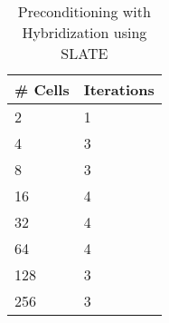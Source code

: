 \documentclass[11pt]{article}
\begin{document}
\begin{table}[h!]
	\begin{center}
		\caption{Preconditioning with Hybridization using SLATE}
		\label{tab:table1}
		\begin{tabular}{l|l}
			\toprule 
			\textbf{\# Cells} & \textbf{Iterations}\\
			\midrule 
			2 & 1 \\
			4 & 3 \\
			8 & 3 \\
			16 & 4 \\
			32 & 4 \\
			64 & 4 \\
			128 & 3 \\
 			256 & 3 \\
			\bottomrule
		\end{tabular}
	\end{center}
\end{table}




 
\end{document}
